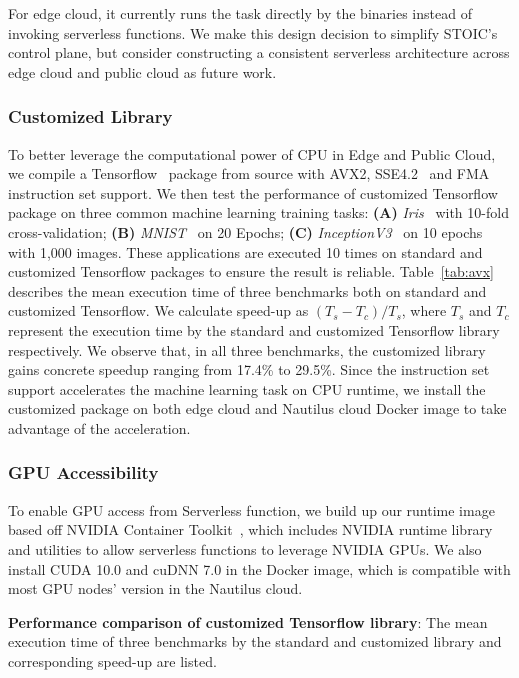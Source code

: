  For edge cloud, it currently runs the task directly by the binaries instead of invoking serverless functions. We make this design decision to simplify STOIC's control plane, but consider constructing a consistent serverless architecture across edge cloud and public cloud as future work.
 
 \BlankLine
 \subsubsection{Customized Library}
 To better leverage the computational power of CPU in Edge and Public Cloud, we compile a Tensorflow~\cite{ref:tensorflow} package from source with AVX2, SSE4.2~\cite{ref:avx} and FMA~\cite{ref:fma} instruction set support. We then test the performance of customized Tensorflow package on three common machine learning training tasks: \textbf{(A)} \textit{Iris}~\cite{ref:iris} with 10-fold cross-validation; \textbf{(B)} \textit{MNIST}~\cite{ref:mnist} on 20 Epochs; \textbf{(C)} \textit{InceptionV3}~\cite{ref:v3} on 10 epochs with 1,000 images. These applications are executed 10 times on standard and customized Tensorflow packages to ensure the result is reliable. Table~\ref{tab:avx} describes the mean execution time of three benchmarks both on standard and customized Tensorflow. We calculate speed-up as $(T_s - T_c) / T_s$, where $T_s$ and $T_c$ represent the execution time by the standard and customized Tensorflow library respectively. We observe that, in all three benchmarks, the customized library gains concrete speedup ranging from 17.4\% to 29.5\%. Since the instruction set support accelerates the machine learning task on CPU runtime, we install the customized package on both edge cloud and Nautilus cloud Docker image to take advantage of the acceleration.
 
 \BlankLine
 \subsubsection{GPU Accessibility}
 To enable GPU access from Serverless function, we build up our runtime image based off NVIDIA Container Toolkit~\cite{ref:nvidia}, which includes NVIDIA runtime library and utilities to allow serverless functions to leverage NVIDIA GPUs. We also install CUDA 10.0 and cuDNN 7.0 in the Docker image, which is compatible with most GPU nodes' version in the Nautilus cloud. 
 
\begin{table}[]
\centering

\caption{\textbf{Performance comparison of customized Tensorflow library}: The mean execution time of three benchmarks by the standard and customized library and corresponding speed-up are listed.  }
\label{tab:avx}
\end{table}
 
